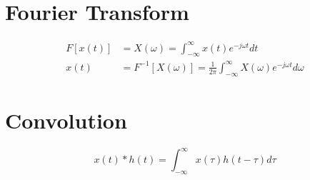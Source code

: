 
\section{Fourier Transform}
\begin{align*}
F\left[x(t)\right] &= X(\omega) = \int_{-\infty}^{\infty}x(t)e^{-j\omega t}dt \\
x(t) &= F^{-1}\left[X(\omega)\right] = \frac{1}{2\pi}\int_{-\infty}^{\infty}X(\omega)e^{-j\omega t}d\omega
\end{align*}

\section{Convolution}
\[x(t) * h(t) = \int_{-\infty}^{\infty}x(\tau)h(t-\tau)d\tau\]


